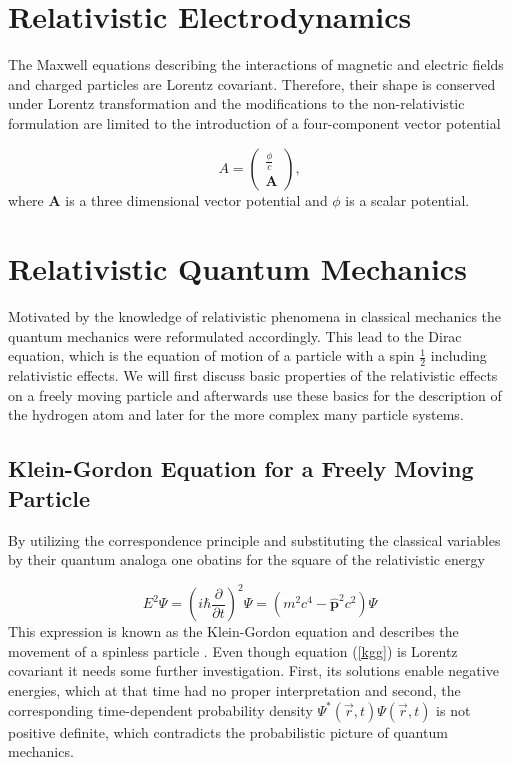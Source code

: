 \section{Relativistic Electrodynamics}
The Maxwell equations describing the interactions of magnetic and electric fields
and charged particles are Lorentz covariant. Therefore, their shape
is conserved under Lorentz transformation and the modifications to the
non-relativistic formulation are limited to the introduction of a four-component
vector potential

\begin{equation}
A = \begin{pmatrix}\frac{\phi}{c}\\\mathbf{A}\end{pmatrix},
\end{equation}
where $\mathbf{A}$ is a three dimensional vector potential and $\phi$ is a scalar
potential.



\section{Relativistic Quantum Mechanics}
Motivated by the knowledge of relativistic phenomena in classical mechanics
the quantum mechanics were reformulated accordingly. This lead to the
Dirac equation, which is the equation of motion of a particle with a spin
$\frac12$ including relativistic effects. We will first discuss basic
properties of the relativistic effects on a freely moving particle and afterwards
use these basics for the description of the hydrogen atom and later for the more
complex many particle systems.

\subsection{Klein-Gordon Equation for a Freely Moving Particle}
By utilizing the correspondence principle and substituting the classical variables
by their quantum analoga one obatins for the square of the relativistic energy



\begin{equation}\label{kgg}
E^2\Psi = \left(i\hbar \frac\partial{\partial t}\right)^2\Psi = \left(m^2c^4-\hat{\mathbf{p}}^2c^2\right) \Psi
\end{equation}
This expression is known as the Klein-Gordon equation and describes the movement of
a spinless particle \cite{kellogg97}.
Even though equation (\ref{kgg}) is Lorentz covariant it needs some further
investigation. First, its solutions enable negative energies, which at that
time had no proper interpretation
and second, the corresponding time-dependent probability
density $\Psi^*(\vec{r},t)\Psi(\vec{r},t)$ is not positive definite, which
contradicts the probabilistic picture of quantum mechanics.

